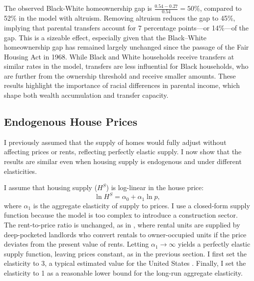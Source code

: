 \documentclass[12pt]{article}
\begin{document}
The observed Black-White homeownership gap is $\frac{0.54 - 0.27}{0.54} = 50\%$, compared to 52\% in the model with altruism. Removing altruism reduces the gap to 45\%, implying that parental transfers account for 7 percentage points---or 14\%---of the gap. This is a sizeable effect, especially given that the Black–White homeownership gap has remained largely unchanged since the passage of the Fair Housing Act in 1968. While Black and White households receive transfers at similar rates in the model, transfers are less influential for Black households, who are further from the ownership threshold and receive smaller amounts. These results highlight the importance of racial differences in parental income, which shape both wealth accumulation and transfer capacity. 

\subsection{Endogenous House Prices}\label{sec:endoprice}
I previously assumed that the supply of homes would fully adjust without affecting prices or rents, reflecting perfectly elastic supply. I now show that the results are similar even when housing supply is endogenous and under different elasticities.

I assume that housing supply ($H^S$) is log-linear in the house price:
\begin{equation}
\label{eq:hsupply}
\ln H^S = \alpha_0 + \alpha_1 \ln p,
\end{equation}
where $\alpha_1$ is the aggregate elasticity of supply to prices. I use a closed-form supply function because the model is too complex to introduce a construction sector. The rent-to-price ratio is unchanged, as in \cite{Kaplan2020}, where rental units are supplied by deep-pocketed landlords who convert rentals to owner-occupied units if the price deviates from the present value of rents. Letting $\alpha_1\to\infty$ yields a perfectly elastic supply function, leaving prices constant, as in the previous section. I first set the elasticity to 3, a typical estimated value for the United States \cite[see e.g.,][]{saiz2010geographic,aastveit2023changing}. Finally, I set the elasticity to 1 as a reasonable lower bound for the long-run aggregate elasticity.
\end{document}
